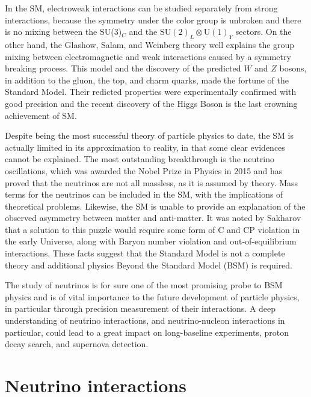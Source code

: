 In the SM, electroweak interactions can be studied separately from strong interactions, %
because the symmetry under the color group is unbroken and there is no mixing %
between the SU(3)$_C$ and the $\mathrm{SU(2)}_L \otimes \mathrm{U(1)}_Y$ sectors.
On the other hand, the Glashow, Salam, and Weinberg theory well explains the group mixing between %
electromagnetic and weak interactions caused by a symmetry breaking process.
This model and the discovery of the predicted $W$ and $Z$ bosons, in addition to the gluon, %
the top, and charm quarks, made the fortune of the Standard Model.
Their redicted properties were experimentally confirmed with good precision and %
the recent discovery of the Higgs Boson is the last crowning achievement of SM.

Despite being the most successful theory of particle physics to date, the SM is actually limited %
in its approximation to reality, in that some clear evidences cannot be explained.
The most outstanding breakthrough is the neutrino oscillations, which was awarded the Nobel Prize in Physics in 2015 %
and has proved that the neutrinos are not all massless, as it is assumed by theory.
Mass terms for the neutrinos can be included in the SM, with the implications of theoretical problems.
Likewise, the SM is unable to provide an explanation of the observed asymmetry between matter and anti-matter.
It was noted by Sakharov that a solution to this puzzle would require some form of C and CP violation %
in the early Universe, along with Baryon number violation and out-of-equilibrium interactions.
These facts suggest that the Standard Model is not a complete theory and additional physics %
Beyond the Standard Model (BSM) is required.

The study of neutrinos is for sure one of the most promising probe to BSM physics and %
is of vital importance to the future development of particle physics, %
in particular through precision measurement of their interactions.
A deep understanding of neutrino interactions, and neutrino-nucleon interactions in particular, %
could lead to a great impact on long-baseline experiments, proton decay search, and supernova detection.

\section{Neutrino interactions}
\label{sec:inter}

